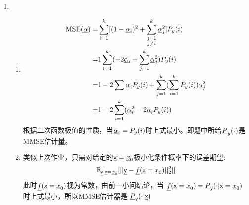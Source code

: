 \documentclass[a4paper]{article}
\begin{document}
\begin{enumerate}[label=\thehwcnt.\arabic*.]
\begin{enumerate}[label=(\alph*)]
\begin{enumerate}[label=\roman*.]
    \end{enumerate}
    \item 
      \begin{enumerate}[label=\roman*.]
        \item
            \begin{align*}
            \operatorname{MSE}(\underline{\alpha}) = & \sum_{i=1}^k [(1-\underline{\alpha}_i)^2+\sum_{\substack{j=1\\j\neq i}}^k \underline{\alpha}_j^2]P_y(i) \\
            = & 1 \sum_{i=1}^k (- 2\underline{\alpha}_i +\sum_{j=1}^k \underline{\alpha}_j^2) P_y(i)\\
            = & 1- 2 \sum \underline{\alpha}_i P_y(i) + \sum_{j=1}^k (\sum_{i=1}^k P_y(i))\underline{\alpha}_j^2\\
            = & 1- 2 \sum_{i=1}^k (\underline{\alpha}_i^2-2\underline{\alpha}_i P_y(i))
            \end{align*}
        根据二次函数极值的性质，当$\underline{\alpha}_i=P_y(i)$时上式最小。即题中所给$\underline{P}_y(\cdot)$是MMSE估计量。
        \item
            类似上次作业，只需对给定的$\underline{\mathsf{x}}=\underline{x}_0$极小化条件概率下的误差期望:
            \begin{equation}
            \operatorname{\mathbb{E}}_{\underline{\mathsf{y}}|\underline{\mathsf{x}}=\underline{x}_0}[||\underline{\mathsf{y}}-\underline{f}(\underline{\mathsf{x}}=\underline{x}_0)||_2^2 |]            
            \end{equation}
            此时$\underline{f}(\underline{\mathsf{x}}=\underline{x}_0)$视为常数，由前一小问结论，当
            $\underline{f}(\underline{\mathsf{x}}=\underline{x}_0)=\underline{P}_{\mathsf{y}}(\cdot|\underline{\mathsf{x}}=\underline{x}_0)$时上式最小，所以MMSE估计器是
            $\underline{P}_{\mathsf{y}}(\cdot|\underline{\mathsf{x}})$
                   

\end{enumerate}
\end{enumerate}
\end{enumerate}
\end{document}
